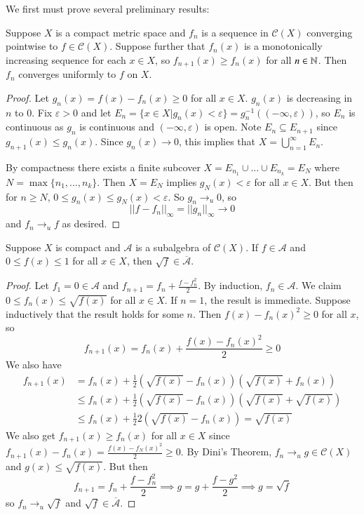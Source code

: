We first must prove several preliminary results:

\begin{theorem}
    Suppose $X$ is a compact metric space and $f_n$ is a sequence in $\mathcal{C}(X)$ converging pointwise to $f \in \mathcal{C}(X)$. Suppose further that $f_n(x)$ is a monotonically increasing sequence for each $x \in X$, so $f_{n+1}(x) \geq f_n(x)$ for all $n \in \mathbb N$. Then $f_n$ converges uniformly to $f$ on $X$.
\end{theorem}
\begin{proof}
    Let $g_n(x) = f(x) - f_n(x) \geq 0$ for all $x \in X$. $g_n(x)$ is decreasing in $n$ to $0$. Fix $\varepsilon > 0$ and let $E_n = \{x \in X\vert g_n(x) < \varepsilon\} = g_n^{-1}((-\infty,\varepsilon))$, so $E_n$ is continuous as $g_n$ is continuous and $(-\infty,\varepsilon)$ is open. Note $E_n \subseteq E_{n+1}$ since $g_{n+1}(x) \leq g_n(x)$. Since $g_n(x)\rightarrow 0$, this implies that $X = \bigcup_{n=1}^{\infty}E_n$. 

    By compactness there exists a finite subcover $X = E_{n_1}\cup...\cup E_{n_k} = E_N$ where $N = \max\{n_1,...,n_k\}$. Then $X = E_N$ implies $g_N(x) < \varepsilon$ for all $x \in X$. But then for $n \geq N$, $0 \leq g_n(x) \leq g_N(x) < \varepsilon$. So $g_n\rightarrow_u 0$, so $$||f-f_n||_{\infty}=||g_n||_{\infty}\rightarrow 0$$ and $f_n\rightarrow_uf$ as desired.
\end{proof}

\begin{lemma}
    Suppose $X$ is compact and $\mathcal{A}$ is a subalgebra of $\mathcal{C}(X)$. If $f \in \mathcal{A}$ and $0 \leq f(x) \leq 1$ for all $x \in X$, then $\sqrt{f} \in \overline{\mathcal{A}}$. 
\end{lemma}
\begin{proof}
    Let $f_1 = 0 \in \mathcal{A}$ and $f_{n+1} = f_n + \frac{f-f_n^2}{2}$. By induction, $f_n \in \mathcal{A}$. We claim $0 \leq f_n(x) \leq \sqrt{f(x)}$ for all $x \in X$. If $n = 1$, the result is immediate. Suppose inductively that the result holds for some $n$. Then $f(x) - f_n(x)^2 \geq 0$ for all $x$, so $$f_{n+1}(x) = f_n(x) + \frac{f(x) - f_n(x)^2}{2} \geq 0$$ We also have \begin{align*}
        f_{n+1}(x) &= f_n(x)+\frac{1}{2}(\sqrt{f(x)}-f_n(x))(\sqrt{f(x)}+f_n(x)) \\
        &\leq f_n(x) + \frac{1}{2}(\sqrt{f(x)} - f_n(x))(\sqrt{f(x)} + \sqrt{f(x)}) \\
        &\leq f_n(x) + \frac{1}{2}2(\sqrt{f(x)}-f_n(x)) = \sqrt{f(x)}
    \end{align*}
    We also get $f_{n+1}(x) \geq f_n(x)$ for all $x \in X$ since $f_{n+1}(x) - f_n(x) = \frac{f(x) - f_N(x)^2}{2} \geq 0$. By Dini's Theorem, $f_n\rightarrow_ug \in \mathcal{C}(X)$ and $g(x) \leq \sqrt{f(x)}$. But then $$f_{n+1}=f_n + \frac{f-f_n^2}{2} \implies g = g + \frac{f-g^2}{2} \implies g = \sqrt{f}$$ so $f_n\rightarrow_u\sqrt{f}$ and $\sqrt{f} \in \overline{\mathcal{A}}$.
\end{proof}

